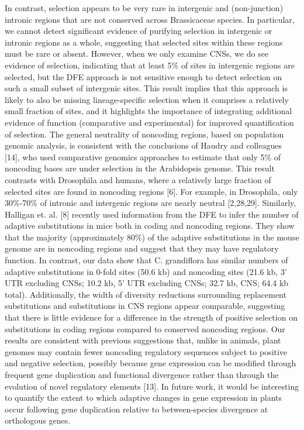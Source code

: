 In contrast, selection appears to be very rare in intergenic and (non-junction) intronic regions that are not conserved across Brassicaceae species. In particular, we cannot detect significant evidence of purifying selection in intergenic or intronic regions as a whole, suggesting that selected sites within these regions must be rare or absent. However, when we only examine CNSs, we do see evidence of selection, indicating that at least 5\% of sites in intergenic regions are selected, but the DFE approach is not sensitive enough to detect selection on such a small subset of intergenic sites. This result implies that this approach is likely to also be missing lineage-specific selection when it comprises a relatively small fraction of sites, and it highlights the importance of integrating additional evidence of function (comparative and experimental) for improved quantification of selection.
The general neutrality of noncoding regions, based on population genomic analysis, is consistent with the conclusions of Haudry and colleagues [14], who used comparative genomics approaches to estimate that only 5\% of noncoding bases are under selection in the Arabidopsis genome. This result contrasts with Drosophila and humans, where a relatively large fraction of selected sites are found in noncoding regions [6]. For example, in Drosophila, only 30\%-70\% of intronic and intergenic regions are nearly neutral [2,28,29]. Similarly, Halligan et. al. [8] recently used information from the DFE to infer the number of adaptive substitutions in mice both in coding and noncoding regions. They show that the majority (approximately 80\%) of the adaptive substitutions in the mouse genome are in noncoding regions and suggest that they may have regulatory function. In contrast, our data show that C. grandiflora has similar numbers of adaptive substitutions in 0-fold sites (50.6 kb) and noncoding sites (21.6 kb, 3’ UTR excluding CNSs; 10.2 kb, 5’ UTR excluding CNSs; 32.7 kb, CNS; 64.4 kb total). Additionally, the width of diversity reductions surrounding replacement substitutions and substitutions in CNS regions appear comparable, suggesting that there is little evidence for a difference in the strength of positive selection on substitutions in coding regions compared to conserved noncoding regions. Our results are consistent with previous suggestions that, unlike in animals, plant genomes may contain fewer noncoding regulatory sequences subject to positive and negative selection, possibly because gene expression can be modified through frequent gene duplication and functional divergence rather than through the evolution of novel regulatory elements [13]. In future work, it would be interesting to quantify the extent to which adaptive changes in gene expression in plants occur following gene duplication relative to between-species divergence at orthologous genes.

